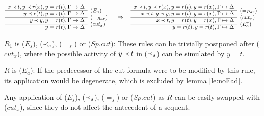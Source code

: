 \begin{PROOF}
\begin{LS}
\begin{LSA}
{\scriptsize  \[ \begin{array}{rl}
x\Incl t,  y \Incl r(x),  y=r(t), \GSD \\ \cline{1-1}
 y \Incl r(t),  y=r(t), \GSD  & \rabove{(E_a)} \\ \cline{1-1}
 y \Incl y,  y=r(t), \GSD  & \rabove{(=_{Rar})} \\ \cline{1-1}
  y=r(t), \GSD  & \rabove{(cut_x)} \end{array} \conv
  \begin{array}{rl}
x\Incl t,  y \Incl r(x),  y=r(t), y=r(x), \GSD \\ \cline{1-1}
x\Incl t,  y \Incl y,  y=r(t), y=r(x), \GSD  & \rabove{(=_{Rar})} \\ \cline{1-1}
 x \Incl t,  y=r(t), y=r(x), \GSD  & \rabove{(cut_x)} \\ \cline{1-1}
  y=r(t), y=r(t), \GSD  & \rabove{(E_a^*)} \end{array} \] }
\item $R_1$ is ($E_s$), ($\mathbin{\prec}_s$), ($=_s$) or ($Sp.cut$):
These rules can be trivially postponed after ($cut_x$), where the possible
activity of $y\mathbin{\prec} t$ in ($\mathbin{\prec}_s$) can be simulated by $y=t$.
\end{LSA}
%
\item $R$ is ($E_a$): If the predecessor of the cut formula were to be
modified by this rule, its application would be degenerate, which is
excluded by lemma \ref{le:noEad}.
\item Any application of ($E_s$), ($\mathbin{\prec}_s$), ($=_s$) or ($Sp.cut$) as $R$
can be easily swapped with ($cut_x$), since they do not affect the antecedent of a sequent.
\end{LS}
\end{PROOF}
%

